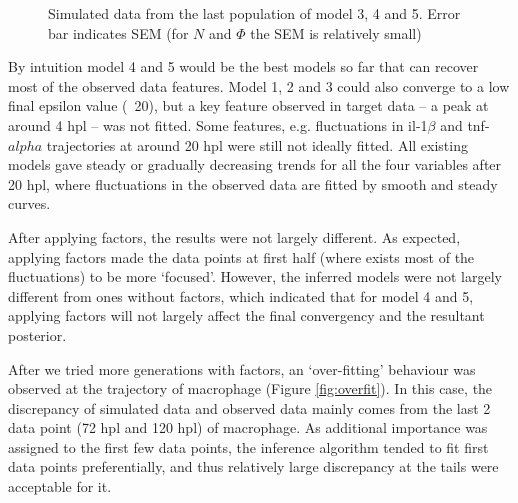 \begin{figure}
    \begin{center}
    \end{center}

    \caption{Simulated data from the last population of model 3, 4 and 5. Error bar indicates SEM (for $N$ and $\Phi$ the SEM is relatively small)}
    \label{fig:resultCurve345}

\end{figure}

By intuition model 4 and 5 would be the best models so far that can recover most of the observed data features. Model 1, 2 and 3 could also converge to a low final epsilon value (~20), but a key feature observed in target data -- a peak at around 4 hpl -- was not fitted. Some features, e.g. fluctuations in il-1$\beta$ and tnf-$alpha$ trajectories at around 20 hpl were still not ideally fitted. All existing models gave steady or gradually decreasing trends for all the four variables after 20 hpl, where fluctuations in the observed data are fitted by smooth and steady curves.

After applying factors, the results were not largely different. As expected, applying factors made the data points at first half (where exists most of the fluctuations) to be more `focused'. However, the inferred models were not largely different from ones without factors, which indicated that for model 4 and 5, applying factors will not largely affect the final convergency and the resultant posterior.

After we tried more generations with factors, an `over-fitting' behaviour was observed at the trajectory of macrophage (Figure \ref{fig:overfit}). In this case, the discrepancy of simulated data and observed data mainly comes from the last 2 data point (72 hpl and 120 hpl) of macrophage. As additional importance was assigned to the first few data points, the inference algorithm tended to fit first data points preferentially, and thus relatively large discrepancy at the tails were acceptable for it.

